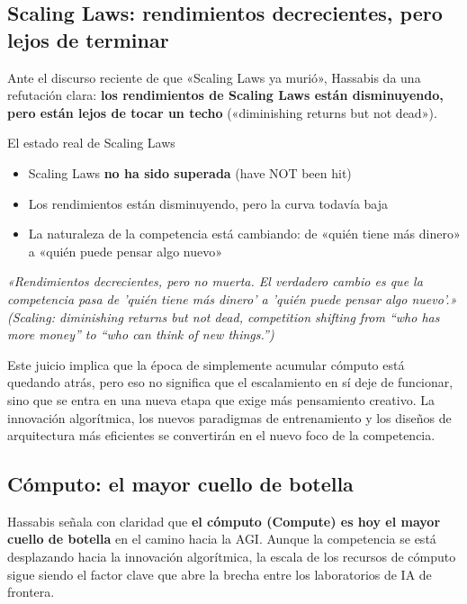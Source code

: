 \documentclass[a4paper]{article}
\begin{document}
\subsection{Scaling Laws: rendimientos decrecientes, pero lejos de terminar}

Ante el discurso reciente de que «Scaling Laws ya murió», Hassabis da una refutación clara: \textbf{los rendimientos de Scaling Laws están disminuyendo, pero están lejos de tocar un techo} («diminishing returns but not dead»).

\begin{importantbox}{El estado real de Scaling Laws}
\begin{itemize}
    \item Scaling Laws \textbf{no ha sido superada} (have NOT been hit)
    \item Los rendimientos están disminuyendo, pero la curva todavía baja
    \item La naturaleza de la competencia está cambiando: de «quién tiene más dinero» a «quién puede pensar algo nuevo»
\end{itemize}
\textit{«Rendimientos decrecientes, pero no muerta. El verdadero cambio es que la competencia pasa de 'quién tiene más dinero' a 'quién puede pensar algo nuevo'.» (Scaling: diminishing returns but not dead, competition shifting from ``who has more money'' to ``who can think of new things.'')}
\end{importantbox}

Este juicio implica que la época de simplemente acumular cómputo está quedando atrás, pero eso no significa que el escalamiento en sí deje de funcionar, sino que se entra en una nueva etapa que exige más pensamiento creativo. La innovación algorítmica, los nuevos paradigmas de entrenamiento y los diseños de arquitectura más eficientes se convertirán en el nuevo foco de la competencia.

\subsection{Cómputo: el mayor cuello de botella}

Hassabis señala con claridad que \textbf{el cómputo (Compute) es hoy el mayor cuello de botella} en el camino hacia la AGI. Aunque la competencia se está desplazando hacia la innovación algorítmica, la escala de los recursos de cómputo sigue siendo el factor clave que abre la brecha entre los laboratorios de IA de frontera.
\end{document}
